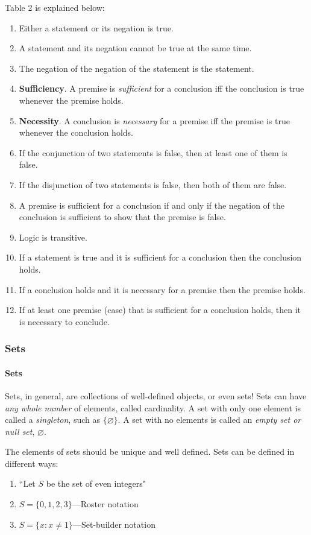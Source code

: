 Table 2 is explained below:
\begin{enumerate}
    \item Either a statement or its negation is true.
    \item A statement and its negation cannot be true at the same time.
    \item The negation of the negation of the statement is the statement.
    \item {\bfseries Sufficiency}. A premise is \emph{sufficient} for a conclusion iff the conclusion is true whenever the premise holds.
    \item {\bfseries Necessity}. A conclusion is \emph{necessary} for a premise iff the premise is true whenever the conclusion holds.
    \item If the conjunction of two statements is false, then at least one of them is false.
    \item If the disjunction of two statements is false, then both of them are false.
    \item A premise is sufficient for a conclusion if and only if the negation of the conclusion is sufficient to show that the premise is false.
    \item Logic is transitive.
    \item If a statement is true and it is sufficient for a conclusion then the conclusion holds.
    \item If a conclusion holds and it is necessary for a premise then the premise holds.
    \item If at least one premise (case) that is sufficient for a conclusion holds, then it is necessary to conclude.
\end{enumerate}

\subsubsection{Sets}
\paragraph{Sets}
Sets, in general, are collections of well-defined objects, or even sets!
Sets can have \emph{any whole number} of elements, called cardinality.
A set with only one element is called a \emph{singleton}, such as $\{\varnothing\}$.
A set with no elements is called an \emph{empty set or null set}, $\varnothing$.

The elements of sets should be unique and well defined. Sets can be defined in different ways:
\begin{enumerate}
    \item ``Let $S$ be the set of even integers"
    \item $S = \{0, 1, 2, 3\}$---Roster notation
    \item $S = \{x : x \neq 1\}$---Set-builder notation
\end{enumerate}


